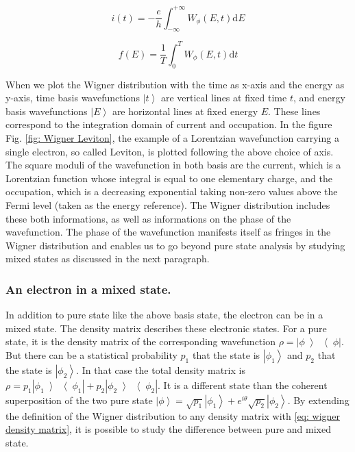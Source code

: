 \begin{equation}
i\left(t\right) = -\frac{e}{h}\int_{-\infty}^{+\infty} W_{\phi}\left(E,t\right)\mathrm{d}E  \label{eq: time marginals wigner pure state}
\end{equation}

\begin{equation}
f\left(E\right) = \frac{1}{T}\int_{0}^{T} W_{\phi}\left(E,t\right)\mathrm{d}t \label{eq: energy marginals wigner pure state}
\end{equation}

When we plot the Wigner distribution with the time as x-axis and the energy as y-axis, time basis wavefunctions $\left|t\right>$ are vertical lines at fixed time $t$, and energy basis wavefunctions $\left|E\right>$ are horizontal lines at fixed energy $E$.
These lines correspond to the integration domain of current and occupation.
In the figure Fig. \ref{fig: Wigner Leviton}, the example of a Lorentzian wavefunction carrying a single electron, so called Leviton, is plotted following the above choice of axis.
The square moduli of the wavefunction in both basis are the current, which is a Lorentzian function whose integral is equal to one elementary charge, and the occupation, which is a decreasing exponential taking non-zero values above the Fermi level (taken as the energy reference). 
The Wigner distribution includes these both informations, as well as informations on the phase of the wavefunction.
The phase of the wavefunction manifests itself as fringes in the Wigner distribution and enables us to go beyond pure state analysis by studying mixed states as discussed in the next paragraph.

\subsubsection*{An electron in a mixed state.}

In addition to pure state like the above basis state, the electron can be in a mixed state.
The density matrix \cite{cahill1999density} describes these electronic states.
For a pure state, it is the density matrix of the corresponding wavefunction $\rho = \left|\phi\left>\right<\phi\right|$.
But there can be a statistical probability $p_{1}$ that the state is $\left|\phi_{1}\right>$ and  $p_{2}$ that the state is $\left|\phi_{2}\right>$.
In that case the total density matrix is $\rho = p_{1}\left|\phi_{1}\left>\right<\phi_{1}\right|+p_{2}\left|\phi_{2}\left>\right<\phi_{2}\right|$.
It is a different state than the coherent superposition of the two pure state $\left|\phi\right> = \sqrt{p_1}\left|\phi_1\right>+e^{i\theta}\sqrt{p_2}\left|\phi_2\right> $.
By extending the definition of the Wigner distribution to any density matrix with \eqref{eq: wigner density matrix}, it is possible to study the difference between pure and mixed state.

